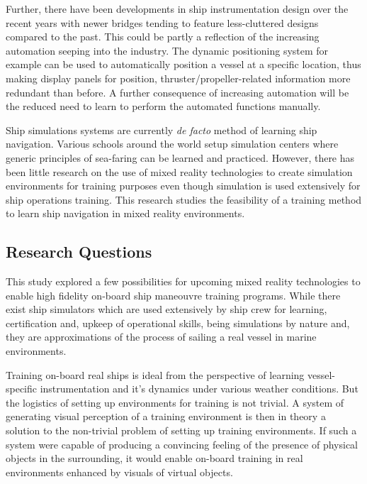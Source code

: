 Further, there have been developments in ship instrumentation design over the recent years with newer bridges tending to feature less-cluttered designs compared to the past. This could be partly a reflection of the increasing automation seeping into the industry. The dynamic positioning system for example can be used to automatically position a vessel at a specific location, thus making display panels for position, thruster/propeller-related information more  redundant than before. A further consequence of increasing automation will be the reduced need to learn to perform the automated functions manually.

Ship simulations systems are currently \textit{de facto} method of learning ship navigation. Various schools around the world setup simulation centers where generic principles of sea-faring can be learned and practiced. However, there has been little research on the use of mixed reality technologies to create simulation environments for training purposes even though simulation is used extensively for ship operations training. This research studies the feasibility of a training method to learn ship navigation in mixed reality environments. 


\subsection{Research Questions}
This study explored a few possibilities for upcoming mixed reality technologies to enable high fidelity on-board ship maneouvre training programs. While there exist ship simulators which are used extensively by ship crew for learning, certification and, upkeep of operational skills, being simulations by nature and, they are approximations of the process of sailing a real vessel in marine environments. 

Training on-board real ships is ideal from the perspective of learning vessel-specific instrumentation and it's dynamics under various weather conditions. But the logistics of setting up environments for training is not trivial. A system of generating visual perception of a training environment is then in theory a solution to the non-trivial problem of setting up training environments. If such a system were capable of producing a convincing feeling of the presence of physical objects in the surrounding, it would enable on-board training in real environments enhanced by visuals of virtual objects. 


